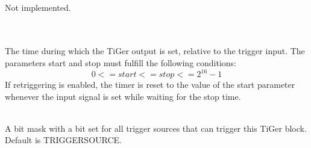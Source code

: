 	\\
	Not implemented.


	\\
	\\
	The time during which the TiGer output is set, relative to the trigger input. The parameters \textsf{start} and \textsf{stop} must fulfill the following conditions:
	\[ 0 <= start <= stop <= 2^{16}-1 \]
	If retriggering is enabled, the timer is reset to the value of the start parameter whenever the input signal is set while waiting for the stop time. \par


	\\
	A bit mask with a bit set for all trigger sources that can trigger this TiGer block.
	Default is \textsf{\PREFIX TRIGGER\tu SOURCE\tu {}}.\par

